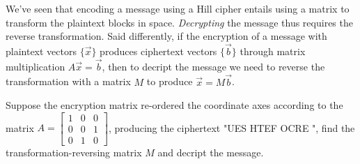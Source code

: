 \documentclass{ximera}
\begin{document}
We've seen that encoding a message using a Hill cipher entails using a matrix to transform the plaintext blocks in space. \emph{Decrypting} the message thus requires the reverse transformation. Said differently, if the encryption of a message with plaintext vectors $\lbrace \vec{x}\rbrace$ produces ciphertext vectors $\lbrace \vec{b}\rbrace$ through matrix multiplication $A\vec{x}=\vec{b}$, then to decript the message we need to reverse the transformation with a matrix $M$ to produce $\vec{x}=M\vec{b}$.

\begin{example}
  Suppose the encryption matrix re-ordered the coordinate axes according to the matrix $A=\begin{bmatrix}
    1&0&0\\0&0&1\\0&1&0
  \end{bmatrix}$, producing the ciphertext "UES HTEF OCRE  ", find the transformation-reversing matrix $M$ and decript the message.
\end{example}
\end{document}
